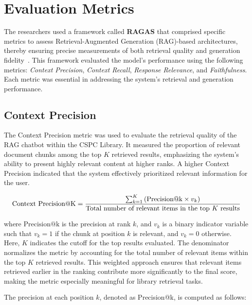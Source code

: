 \begin{refsection}
\begin{enumerate}
\end{enumerate}


\section{Evaluation Metrics}

The researchers used a framework called \textbf{RAGAS} that comprised specific metrics to assess Retrieval-Augmented Generation (RAG)-based architectures, thereby ensuring precise measurements of both retrieval quality and generation fidelity~\cite{oubah2024advanced}. This framework evaluated the model's performance using the following metrics: \textit{Context Precision}, \textit{Context Recall}, \textit{Response Relevance}, and \textit{Faithfulness}. Each metric was essential in addressing the system’s retrieval and generation performance.

\subsection*{Context Precision}

The Context Precision metric was used to evaluate the retrieval quality of the RAG chatbot within the CSPC Library. It measured the proportion of relevant document chunks among the top $K$ retrieved results, emphasizing the system's ability to present highly relevant content at higher ranks. A higher Context Precision indicated that the system effectively prioritized relevant information for the user.

\begin{equation}
\centering
\text{Context Precision@K} = 
\frac{
    \sum_{k=1}^{K} \left( \text{Precision@k} \times v_k \right)
}{
    \text{Total number of relevant items in the top } K \text{ results}
}
\end{equation}

where $\text{Precision@k}$ is the precision at rank $k$, and $v_k$ is a binary indicator variable such that $v_k = 1$ if the chunk at position $k$ is relevant, and $v_k = 0$ otherwise. Here, $K$ indicates the cutoff for the top results evaluated. The denominator normalizes the metric by accounting for the total number of relevant items within the top $K$ retrieved results. This weighted approach ensures that relevant items retrieved earlier in the ranking contribute more significantly to the final score, making the metric especially meaningful for library retrieval tasks.

The precision at each position $k$, denoted as Precision@k, is computed as follows:


\end{refsection}
